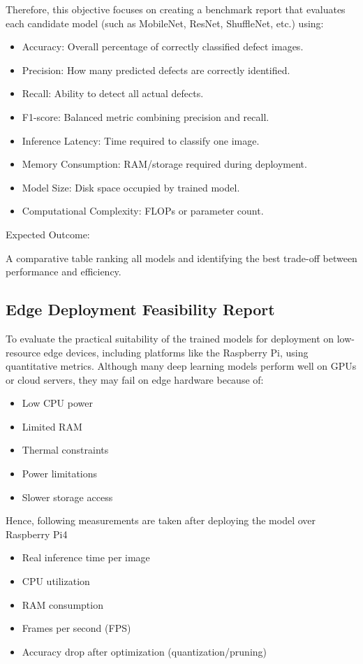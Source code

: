 Therefore, this objective focuses on creating a benchmark report that evaluates each candidate model (such as MobileNet, ResNet, ShuffleNet, etc.) using:
\begin{itemize}
\item Accuracy: Overall percentage of correctly classified defect images.
\item Precision: How many predicted defects are correctly identified.
\item Recall: Ability to detect all actual defects.
\item F1-score: Balanced metric combining precision and recall.
\item Inference Latency: Time required to classify one image.
\item Memory Consumption: RAM/storage required during deployment.
\item Model Size: Disk space occupied by trained model.
\item Computational Complexity: FLOPs or parameter count.
\end{itemize}
Expected Outcome:

A comparative table ranking all models and identifying the best trade-off between performance and efficiency.

\subsection {Edge Deployment Feasibility Report}
To evaluate the practical suitability of the trained models for deployment on low-resource edge devices, including platforms like the Raspberry Pi, using quantitative metrics.
Although many deep learning models perform well on GPUs or cloud servers, they may fail on edge hardware because of:
\begin{itemize}
\item Low CPU power
\item Limited RAM
\item Thermal constraints
\item Power limitations
\item Slower storage access
\end{itemize}

Hence, following measurements are taken after deploying the model over Raspberry Pi4
\begin{itemize}
\item Real inference time per image
\item CPU utilization
\item RAM consumption
\item Frames per second (FPS)
\item Accuracy drop after optimization (quantization/pruning)
\end{itemize}

